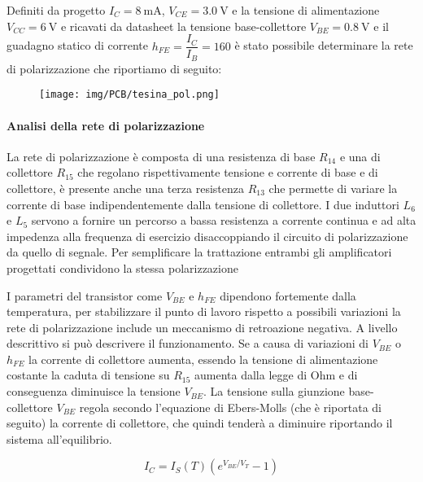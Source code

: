 \documentclass[12pt,oneside]{book}
\begin{document}
Definiti da progetto $I_{C}=\SI{8}{\milli\ampere}$, $V_{CE}=\SI{3.0}{\volt}$ e la tensione di alimentazione $V_{CC}=\SI{6}{\volt}$ e ricavati da datasheet la tensione base-collettore $V_{BE} = \SI{0.8}{\volt}$ e il guadagno statico di corrente $h_{FE} = \dfrac{I_C}{I_B}=160$ è stato possibile determinare la rete di polarizzazione che riportiamo di seguito:

\begin{figure}[!htbp]
    \centering
        \texttt{[image: img/PCB/tesina\_pol.png]}
        \caption{}
    \hfill
\end{figure}

\paragraph{Analisi della rete di polarizzazione}
La rete di polarizzazione è composta di una resistenza di base $R_{14}$ e una di collettore $R_{15}$ che regolano rispettivamente tensione e corrente di base e di collettore, è presente anche una terza resistenza $R_{13}$ che permette di variare la corrente di base indipendentemente dalla tensione di collettore. I due induttori $L_6$ e $L_5$ servono a fornire un percorso a bassa resistenza a corrente continua e ad alta impedenza alla frequenza di esercizio disaccoppiando il circuito di polarizzazione da quello di segnale. Per semplificare la trattazione entrambi gli amplificatori progettati condividono la stessa polarizzazione

I parametri del transistor come $V_{BE}$ e $h_{FE}$ dipendono fortemente dalla temperatura, per stabilizzare il punto di lavoro rispetto a possibili variazioni la rete di polarizzazione include un meccanismo di retroazione negativa. A livello descrittivo si può descrivere il funzionamento. Se a causa di variazioni di $V_{BE}$ o $h_{FE}$ la corrente di collettore aumenta, essendo la tensione di alimentazione costante la caduta di tensione su $R_{15}$ aumenta dalla legge di Ohm e di conseguenza diminuisce la tensione $V_{BE}$. La tensione sulla giunzione base-collettore $V_{BE}$ regola secondo l'equazione di Ebers-Molls (che è riportata di seguito) la corrente di collettore, che quindi tenderà a diminuire riportando il sistema all'equilibrio.

\begin{equation}
    I_C=I_S(T)\left(e^{V_{BE}/V_T}-1\right)
\end{equation}

%
\end{document}

